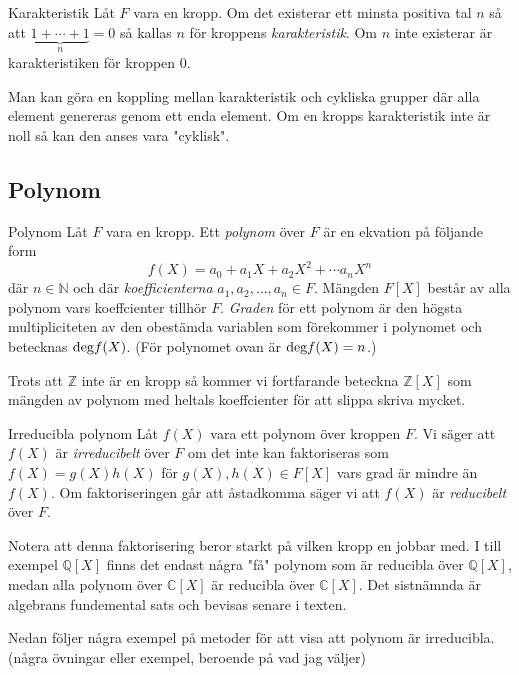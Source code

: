 \documentclass{article}
\newcommand{\grad}[0]{\textnormal{deg}}
\theoremstyle{definition}
\begin{document}
\begin{mydef}{Karakteristik}{}
  Låt $F$ vara en kropp. Om det existerar ett minsta positiva tal $n$ så att $\underbrace{1 + \cdots + 1}_{n} = 0$ så kallas $n$ för kroppens \textit{karakteristik}.
  Om $n$ inte existerar är karakteristiken för kroppen $0.$
\end{mydef}
Man kan göra en koppling mellan karakteristik och cykliska grupper där alla element genereras genom ett enda element. Om en kropps karakteristik inte är noll
så kan den anses vara "cyklisk". 

\subsection{Polynom}
\begin{mydef}{Polynom}{}
  Låt $F$ vara en kropp. Ett \textit{polynom} över $F$ är en ekvation på följande form
  \[f(X) = a_0 + a_1X + a_2X^2 + \cdots a_nX^n\]
  där $n \in \mathbb{N}$ och där \textit{koefficienterna} $a_1, a_2, \ldots, a_n \in F$. 
  Mängden $F[X]$ består av alla polynom vars koeffcienter tillhör $F$. \textit{Graden} för ett polynom är den högsta multipliciteten av den obestämda variablen som förekommer i  
  polynomet och betecknas $\grad f(X)$. (För polynomet ovan är $\grad f(X) = n$.)
\end{mydef}
Trots att $\mathbb{Z}$ inte är en kropp så kommer vi fortfarande beteckna $\mathbb{Z}[X]$ som mängden av polynom med heltals koeffcienter
för att slippa skriva mycket.

\begin{mydef}{Irreducibla polynom}{}
  Låt $f(X)$ vara ett polynom över kroppen $F$. Vi säger att $f(X)$ är \textit{irreducibelt} över $F$ om det inte kan faktoriseras som $f(X) = g(X)h(X)$
  för $g(X), h(X) \in F[X]$ vars grad är mindre än $f(X)$. Om faktoriseringen går att åstadkomma säger vi att $f(X)$ är \textit{reducibelt} över $F.$
\end{mydef}
Notera att denna faktorisering beror starkt på vilken kropp en jobbar med. I till exempel $\mathbb{Q}[X]$ finns det endast några "få" polynom som är reducibla
över $\mathbb{Q}[X]$, medan alla polynom över $\mathbb{C}[X]$ är reducibla över $\mathbb{C}[X]$. Det sistnämnda är algebrans fundemental sats och 
bevisas senare i texten.

Nedan följer några exempel på metoder för att visa att polynom är irreducibla. 
(några övningar eller exempel, beroende på vad jag väljer)
\end{document}

